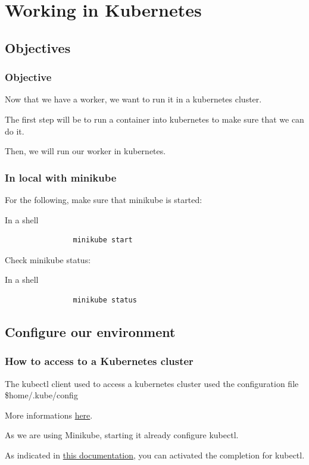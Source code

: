 \section{Working in Kubernetes}

\subsection{Objectives}
	\begin{frame}
		\frametitle{Objective}
		Now that we have a worker, we want to run it in a kubernetes cluster.
		
		\bigskip
		The first step will be to run a container into kubernetes to make sure that we can do it.
		
		Then, we will run our worker in kubernetes.	
	\end{frame}
	
	\begin{frame}[fragile]
		\frametitle{In local with minikube}
	
		For the following, make sure that minikube is started:
		\begin{block}{In a shell}
			\begin{verbatim}
				minikube start
			\end{verbatim}
		\end{block}
	
		Check minikube status:
		\begin{block}{In a shell}
			\begin{verbatim}
				minikube status
			\end{verbatim}
		\end{block}
	\end{frame}
	
\subsection{Configure our environment}
	
	\begin{frame}
		\frametitle{How to access to a Kubernetes cluster}
		
		The kubectl client used to access a kubernetes cluster used the configuration file \$home/.kube/config
		
		More informations \href{https://kubernetes.io/docs/tasks/access-application-cluster/configure-access-multiple-clusters/}{here}.
		
		\bigskip
		
		As we are using Minikube, starting it already configure kubectl.
		
		\bigskip
		
		As indicated in \href{https://kubernetes.io/docs/tasks/tools/install-kubectl/\#enabling-shell-autocompletion}{this documentation}, you can activated the completion for kubectl.
		
	\end{frame}
	
